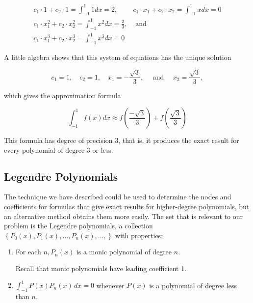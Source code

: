 \documentclass[12pt,a4paper]{article}
\begin{document}
$$
\begin{array}{cc}
c_{1} \cdot 1+c_{2} \cdot 1=\int_{-1}^{1} 1 d x=2, & c_{1} \cdot x_{1}+c_{2} \cdot x_{2}=\int_{-1}^{1} x d x=0 \\
c_{1} \cdot x_{1}^{2}+c_{2} \cdot x_{2}^{2}=\int_{-1}^{1} x^{2} d x=\frac{2}{3}, & \text { and } \\
c_{1} \cdot x_{1}^{3}+c_{2} \cdot x_{2}^{3}=\int_{-1}^{1} x^{3} d x=0
\end{array}
$$

A little algebra shows that this system of equations has the unique solution

$$
c_{1}=1, \quad c_{2}=1, \quad x_{1}=-\frac{\sqrt{3}}{3}, \quad \text { and } \quad x_{2}=\frac{\sqrt{3}}{3},
$$

which gives the approximation formula


\begin{equation}\label{eqngaussquad1}
\int_{-1}^{1} f(x) d x \approx f\left(\frac{-\sqrt{3}}{3}\right)+f\left(\frac{\sqrt{3}}{3}\right) \tag{4.40}
\end{equation}


This formula has degree of precision 3, that is, it produces the exact result for every polynomial of degree 3 or less.

\subsection*{Legendre Polynomials}
The technique we have described could be used to determine the nodes and coefficients for formulas that give exact results for higher-degree polynomials, but an alternative method obtains them more easily. The set that is relevant to our problem is the Legendre polynomials, a collection $\left\{P_{0}(x), P_{1}(x), \ldots, P_{n}(x), \ldots,\right\}$ with properties:\\
\begin{enumerate}[label=(\arabic*)]
\item For each $n, P_{n}(x)$ is a monic polynomial of degree $n$.

Recall that monic polynomials have leading coefficient 1.

\item $\displaystyle\int_{-1}^1P(x)P_n(x)\,dx=0$ whenever $P(x)$ is a polynomial of degree less than $n$.
\end{enumerate}
\end{document}
